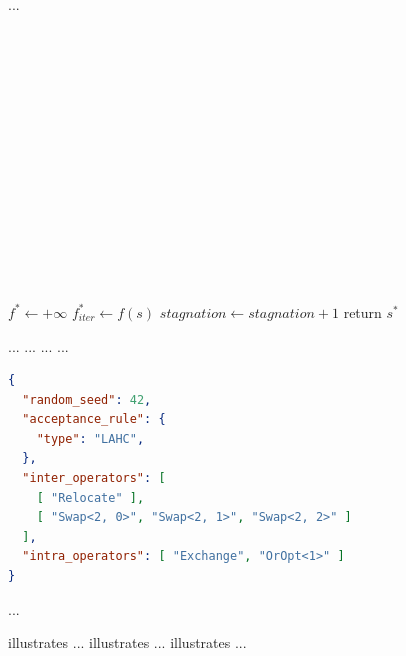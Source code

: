 \documentclass{article}
\newcommand{\AlgName}{YourAlgorithmName}
\begin{document}
 ...

\section{}
\label{sec:s3}

\\
\\
\\
\\
\\
\\

\\
\\
\\
\\
\\
\\


\begin{szxalg}[!tb]
	\caption{\label{alg:framework}General framework of \AlgName{}}
	$f^{*} \leftarrow +\infty$\;\label{line:init}
	{
		{
			$f^{*}_{iter} \leftarrow f(s)$\;\label{line:update}
		}
		\Else
		{
			$stagnation \leftarrow stagnation + 1$\;
		}
	}
	return $s^{*}$\;
\end{szxalg}

 ...
 ...
 ...
 ...

\begin{lstlisting}[language=json,caption={Sample configuration file.},label={code:cfg}]
{
  "random_seed": 42,
  "acceptance_rule": {
    "type": "LAHC",
  },
  "inter_operators": [
    [ "Relocate" ],
    [ "Swap<2, 0>", "Swap<2, 1>", "Swap<2, 2>" ]
  ],
  "intra_operators": [ "Exchange", "OrOpt<1>" ]
}
\end{lstlisting}

 ...

 illustrates ...
 illustrates ...
 illustrates ...
\end{document}
